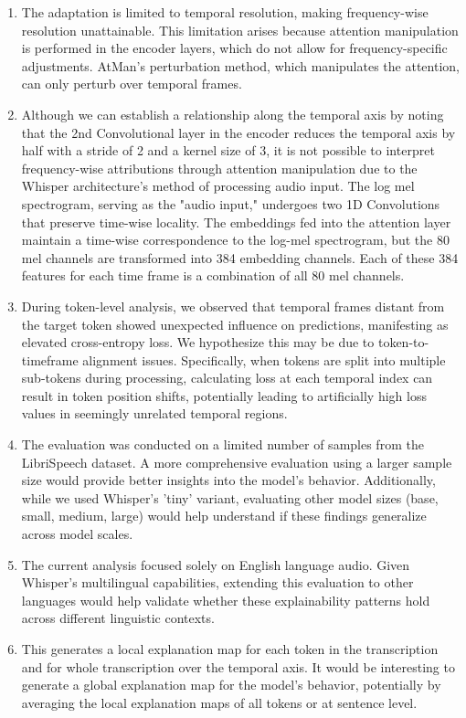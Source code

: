 \documentclass[../report.tex]{subfiles}
\begin{document}
    \begin{enumerate}
        \item The adaptation is limited to temporal resolution, making frequency-wise resolution unattainable. This limitation arises because attention manipulation is performed in the encoder layers, which do not allow for frequency-specific adjustments. AtMan's perturbation method, which manipulates the attention, can only perturb over temporal frames.
        
        \item Although we can establish a relationship along the temporal axis by noting that the 2nd Convolutional layer in the encoder reduces the temporal axis by half with a stride of 2 and a kernel size of 3, it is not possible to interpret frequency-wise attributions through attention manipulation due to the Whisper architecture's method of processing audio input. The log mel spectrogram, serving as the "audio input," undergoes two 1D Convolutions that preserve time-wise locality. The embeddings fed into the attention layer maintain a time-wise correspondence to the log-mel spectrogram, but the 80 mel channels are transformed into 384 embedding channels. Each of these 384 features for each time frame is a combination of all 80 mel channels.

        \item During token-level analysis, we observed that temporal frames distant from the target token showed unexpected influence on predictions, manifesting as elevated cross-entropy loss. We hypothesize this may be due to token-to-timeframe alignment issues. Specifically, when tokens are split into multiple sub-tokens during processing, calculating loss at each temporal index can result in token position shifts, potentially leading to artificially high loss values in seemingly unrelated temporal regions.
        \item The evaluation was conducted on a limited number of samples from the LibriSpeech dataset. A more comprehensive evaluation using a larger sample size would provide better insights into the model's behavior. Additionally, while we used Whisper's 'tiny' variant, evaluating other model sizes (base, small, medium, large) would help understand if these findings generalize across model scales.
        \item The current analysis focused solely on English language audio. Given Whisper's multilingual capabilities, extending this evaluation to other languages would help validate whether these explainability patterns hold across different linguistic contexts.
        \item This generates a local explanation map for each token in the transcription and for whole transcription over the temporal axis. It would be interesting to generate a global explanation map for the model's behavior, potentially by averaging the local explanation maps of all tokens or at sentence level.
    \end{enumerate}
    
\end{document}
